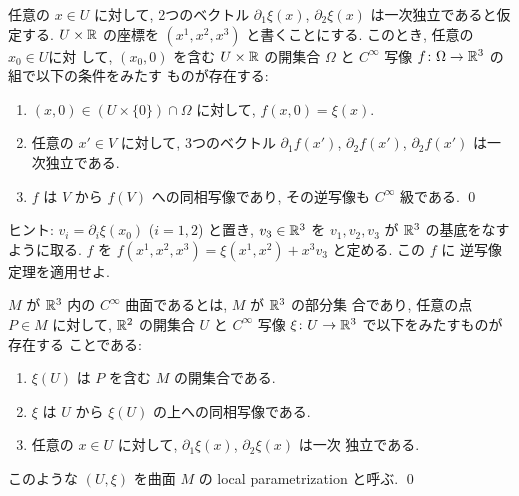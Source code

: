 \documentclass[12pt,twoside]{jarticle}
\def\R{{\Bbb R}} %
\def\rd{\partial}
\begin{document}
\begin{question}\label{q:subsurf1}
  任意の $x \in U$ に対して, 2つのベクトル $\rd_1\xi(x)$,
  $\rd_2\xi(x)$ は一次独立であると仮定する. $U \times \R$ の座標を %
  $(x^1, x^2, x^3)$ と書くことにする. このとき, 任意の $x_0\in U$に対
  して, $(x_0,0)$ を含む $U\times\R$ の開集合 $\Omega$ と %
  $C^\infty$ 写像 $f \colon \Omega \to \R^3$ の組で以下の条件をみたす
  ものが存在する:
  \begin{enumerate}
  \item $(x,0)\in (U\times\{0\})\cap\Omega$ に対して,
    $f(x,0) = \xi(x)$.
  \item 任意の $x'\in V$ に対して, 3つのベクトル %
    $\rd_1 f(x')$, $\rd_2 f(x')$, $\rd_2 f(x')$ は一次独立である.
  \item $f$ は $V$ から $f(V)$ への同相写像であり, %
    その逆写像も $C^\infty$ 級である.
  \qed
  \end{enumerate}
\end{question}

\noindent ヒント: $v_i = \rd_i \xi(x_0)$ ($i = 1,2$) と置き, %
$v_3\in\R^3$ を $v_1,v_2,v_3$ が $\R^3$ の基底をなすように取る. %
$f$ を $f(x^1,x^2,x^3) = \xi(x^1,x^2) + x^3 v_3$ と定める. この $f$ に
逆写像定理を適用せよ.

\begin{Definition}
  $M$ が $\R^3$ 内の $C^\infty$ 曲面であるとは, $M$ が $\R^3$ の部分集
  合であり, 任意の点 $P\in M$ に対して, $\R^2$ の開集合 $U$ と %
  $C^\infty$ 写像 $\xi\colon U \to \R^3$ で以下をみたすものが存在する
  ことである:
  \begin{enumerate}
  \item $\xi(U)$ は $P$ を含む $M$ の開集合である.
  \item $\xi$ は $U$ から $\xi(U)$ の上への同相写像である.
  \item 任意の $x\in U$ に対して, $\rd_1\xi(x)$, $\rd_2\xi(x)$ は一次
    独立である.
  \end{enumerate}
  このような $(U,\xi)$ を曲面 $M$ の local parametrization と呼ぶ.
  \qed
\end{Definition}
\end{document}
